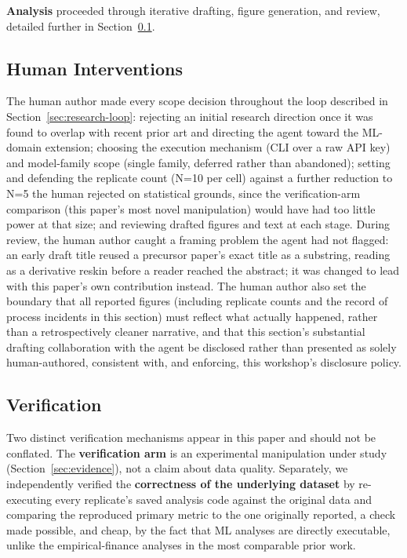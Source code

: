 \documentclass{article}
\begin{document}
\textbf{Analysis} proceeded through iterative drafting, figure generation, and review,
detailed further in Section~\ref{sec:human-interventions}.

\subsection{Human Interventions}
\label{sec:human-interventions}

The human author made every scope decision throughout the loop described in
Section~\ref{sec:research-loop}: rejecting an initial research direction once it was found
to overlap with recent prior art and directing the agent toward the ML-domain extension;
choosing the execution mechanism (CLI over a raw API key) and model-family scope (single
family, deferred rather than abandoned); setting and defending the replicate count (N=10
per cell) against a further reduction to N=5 the human rejected on statistical grounds,
since the verification-arm comparison (this paper's most novel manipulation) would have
had too little power at that size; and reviewing drafted figures and text at each stage.
During review, the human author caught a framing problem the agent had not flagged: an
early draft title reused a precursor paper's exact title as a substring, reading as a
derivative reskin before a reader reached the abstract; it was changed to lead with this
paper's own contribution instead. The human author also set the
boundary that all reported figures (including replicate counts and the record of process
incidents in this section) must reflect what actually happened, rather than a
retrospectively cleaner narrative, and that this section's substantial drafting
collaboration with the agent be disclosed rather than presented as solely human-authored,
consistent with, and enforcing, this workshop's disclosure policy.

\subsection{Verification}
\label{sec:verification}

Two distinct verification mechanisms appear in this paper and should not be conflated. The
\textbf{verification arm} is an experimental manipulation under study
(Section~\ref{sec:evidence}), not a
claim about data quality. Separately, we independently verified the \textbf{correctness of
the underlying dataset} by re-executing every replicate's saved analysis code against the
original data and comparing the reproduced primary metric to the one
originally reported, a check made possible, and cheap, by the fact that ML analyses are
directly executable, unlike the empirical-finance analyses in the most comparable prior
work.
\end{document}
